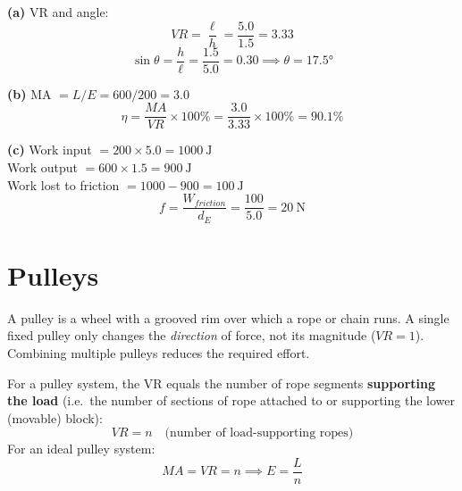 \begin{solutionbox}
\textbf{(a)} VR and angle:
\[
  VR = \frac{\ell}{h} = \frac{5.0}{1.5} = 3.33
\]
\[
  \sin\theta = \frac{h}{\ell} = \frac{1.5}{5.0} = 0.30
  \implies \theta = 17.5°
\]

\textbf{(b)} MA $= L/E = 600/200 = 3.0$
\[
  \eta = \frac{MA}{VR} \times 100\%
  = \frac{3.0}{3.33} \times 100\% = 90.1\%
\]

\textbf{(c)} Work input $= 200 \times 5.0 = 1000\ \text{J}$\\
Work output $= 600 \times 1.5 = 900\ \text{J}$\\
Work lost to friction $= 1000 - 900 = 100\ \text{J}$\\
\[
  f = \frac{W_{friction}}{d_E}
  = \frac{100}{5.0} = 20\ \text{N}
\]
\end{solutionbox}

\section{Pulleys}

A pulley is a wheel with a grooved rim over which a
rope or chain runs. A single fixed pulley only changes
the \textit{direction} of force, not its magnitude
($VR = 1$). Combining multiple pulleys reduces the
required effort.

\begin{lawbox}
For a pulley system, the VR equals the number of
rope segments \textbf{supporting the load} (i.e.\
the number of sections of rope attached to or
supporting the lower (movable) block):
\[
  VR = n \quad \text{(number of load-supporting ropes)}
\]
For an ideal pulley system:
\[
  MA = VR = n
  \implies E = \frac{L}{n}
\]
\end{lawbox}

